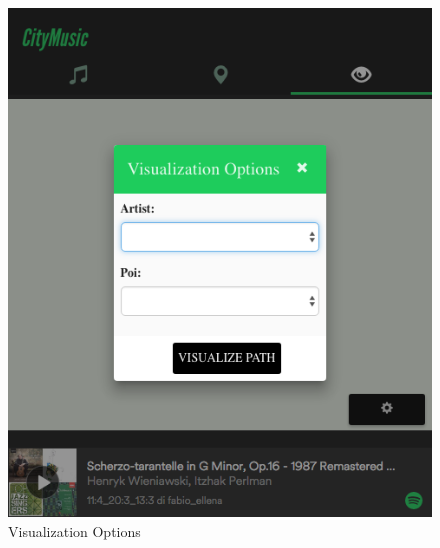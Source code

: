 \documentclass[paper=a4, fontsize=11pt]{scrartcl}
\begin{document}
\begin{figure}[!htb]
\vspace*{0.5cm} %
\begin{minipage}[t]{0.45\textwidth}
\includegraphics[width=\linewidth]{images/Visualization_1.png}
\caption{Visualization Options}
\label{fig:visualization_option}
\end{minipage}
\hspace{\fill}
\begin{minipage}[t]{0.45\textwidth}

\end{minipage}
\end{figure}
\end{document}
